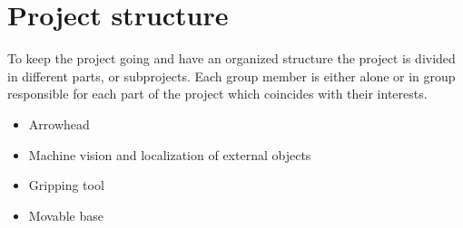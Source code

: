 \section*{Project structure}
To keep the project going and have an organized structure the project is divided 
in different parts, or subprojects. Each group member is either alone or in group responsible for each part of the project which coincides with their interests. 
\begin{itemize}
    \item Arrowhead
    \item Machine vision and localization of external objects
    \item Gripping tool
    \item Movable base
\end{itemize}

